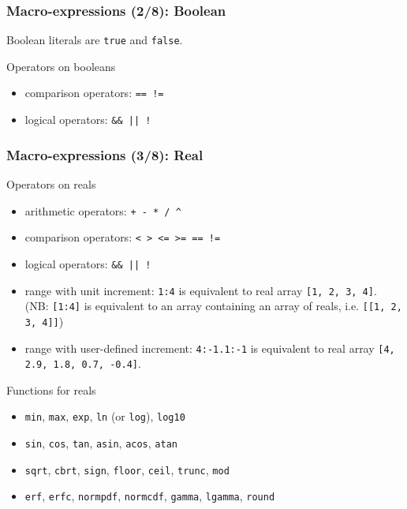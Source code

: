 \documentclass[aspectratio=169]{beamer}
\begin{document}
\begin{frame}[fragile=singleslide]
  \frametitle{Macro-expressions (2/8): Boolean}
  Boolean literals are \texttt{true} and \texttt{false}.
  \begin{block}{Operators on booleans}
    \begin{itemize}
    \item comparison operators: \texttt{== !=}
    \item logical operators: \texttt{\&\& || !}
    \end{itemize}
  \end{block}
\end{frame}

\begin{frame}[fragile=singleslide]
  \frametitle{Macro-expressions (3/8): Real}
  \begin{block}{Operators on reals}
    \begin{itemize}
    \item arithmetic operators: \texttt{+ - * / \^{}}
    \item comparison operators: \texttt{< > <= >= == !=}
    \item logical operators: \verb+&& || !+
    \item range with unit increment: \texttt{1:4} is equivalent to
      real array \texttt{[1, 2, 3, 4]}. (NB: \texttt{[1:4]} is equivalent to an
      array containing an array of reals, i.e. \texttt{[[1, 2, 3, 4]]})
    \item range with user-defined increment: \texttt{4:-1.1:-1} is equivalent to real array \texttt{[4, 2.9, 1.8, 0.7, -0.4]}.
    \end{itemize}
  \end{block}

  \begin{block}{Functions for reals}
    \begin{itemize}
    \item \texttt{min}, \texttt{max}, \texttt{exp}, \texttt{ln} (or \texttt{log}), \texttt{log10}
    \item \texttt{sin}, \texttt{cos}, \texttt{tan}, \texttt{asin}, \texttt{acos}, \texttt{atan}
    \item \texttt{sqrt}, \texttt{cbrt}, \texttt{sign}, \texttt{floor}, \texttt{ceil}, \texttt{trunc}, \texttt{mod}
    \item \texttt{erf}, \texttt{erfc}, \texttt{normpdf}, \texttt{normcdf}, \texttt{gamma}, \texttt{lgamma}, \texttt{round}
    \end{itemize}
  \end{block}
\end{frame}
\end{document}
